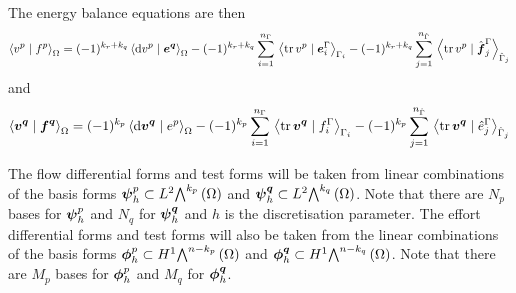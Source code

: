 The energy balance equations are then
\begin{equation}
  \dualityform{v^{p}}{f^{p}}{\Omega}=(-1)^{k_{r}+k_{q}}\dualityform{\exteriorderiv{v^{p}}}{\covectr{e}^{\covectr{q}}}{\Omega}-(-1)^{k_{r}+k_{q}}\gsum{i=1}{n_{\Gamma}}{\dualityform{\trace{}{v^{p}}}{\covectr{e}^{\Gamma}_{i}}{\Gamma_{i}}}-(-1)^{k_{r}+k_{q}}\gsum{j=1}{n_{\hat{\Gamma}}}{\dualityform{\trace{}{v^{p}}}{\hat{\covectr{f}}^{\Gamma}_{j}}{\hat{\Gamma}_{j}}}
\end{equation}
and
\begin{equation}
  \dualityform{\covectr{v}^{\covectr{q}}}{\covectr{f}^{\covectr{q}}}{\Omega}=(-1)^{k_{p}}\dualityform{\exteriorderiv{\covectr{v}^{\covectr{q}}}}{e^{p}}{\Omega}-(-1)^{k_{p}}\gsum{i=1}{n_{\Gamma}}{\dualityform{\trace{}{\covectr{v}^{\covectr{q}}}}{f^{\Gamma}_{i}}{\Gamma_{i}}}-(-1)^{k_{p}}\gsum{j=1}{n_{\hat{\Gamma}}}{\dualityform{\trace{}{\covectr{v}^{\covectr{q}}}}{\hat{e}^{\Gamma}_{j}}{\hat{\Gamma}_{j}}}  
\end{equation}

The flow differential forms and test forms will be taken from linear
combinations of the basis forms \ie
$\covectr{\psi}^{p}_{h}\subset\ltwodiffformspace{k_{p}}{\Omega}$ and
$\covectr{\psi}^{\covectr{q}}_{h}\subset\ltwodiffformspace{k_{q}}{\Omega}$. Note that
  there are $N_{p}$ bases for $ \boldsymbol{\psi} ^{p}_{h}$ and $N_{q}$ for
  $ \boldsymbol{\psi} ^{ \boldsymbol{q} }_{h}$ and $h$ is the discretisation parameter.
The effort differential forms and test forms will also be taken from the
linear combinations of the basis forms \ie
$\covectr{\phi}^{p}_{h}\subset\honediffformspace{n-k_{p}}{\Omega}$ and
$\covectr{\phi}^{\covectr{q}}_{h}\subset\honediffformspace{n-k_{q}}{\Omega}$. Note that
  there are $M_{p}$ bases for $ \boldsymbol{\phi} ^{p}_{h}$ and $M_{q}$ for
  $ \boldsymbol{\phi} ^{ \boldsymbol{q} }_{h}$.
  
